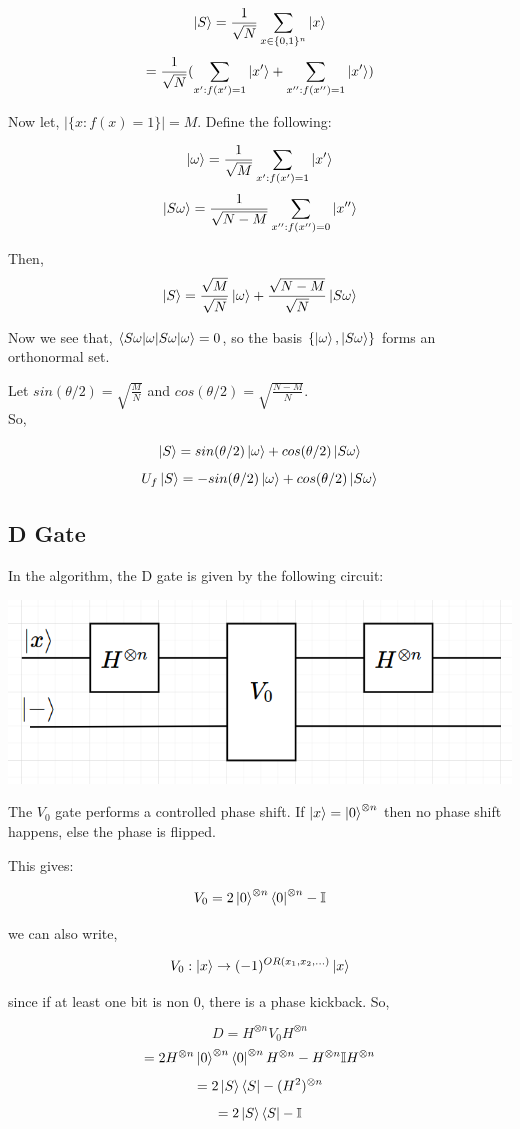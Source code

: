 \documentclass{article}
\begin{document}
$$\ket{S} = \frac{1}{\sqrt{N}}\sum_{x \in \{0,1\}^n}\ket{x}$$
$$=\frac{1}{\sqrt{N}}(\sum_{x': f(x')=1}\ket{x'} + \sum_{x'': f(x'')=1}\ket{x'})$$

Now let, $|\{x: f(x) = 1\}| = M$. Define the following:

$$\ket{\omega} = \frac{1}{\sqrt{M}}\sum_{x': f(x')=1}\ket{x'}$$
$$\ket{S\omega} = \frac{1}{\sqrt{N-M}}\sum_{x'': f(x'')=0}\ket{x''}$$

Then,
$$\ket{S} = \frac{\sqrt{M}}{\sqrt{N}}\ket{\omega} + \frac{\sqrt{N-M}}{\sqrt{N}}\ket{S\omega}$$

Now we see that, $\braket{S\omega|\omega} = 0$, so the basis $\{\ket{\omega}, \ket{S\omega}\}$
forms an orthonormal set.

Let $sin(\theta/2) = \sqrt{\frac{M}{N}}$ and $cos(\theta/2) = \sqrt{\frac{N-M}{N}}$.\\          So,

$$\ket{S} = sin(\theta/2)\ket{\omega} + cos(\theta/2)\ket{S\omega}$$
$$U_f\ket{S} = -sin(\theta/2)\ket{\omega} + cos(\theta/2)\ket{S\omega}$$

\subsection{D Gate}
In the algorithm, the D gate is given by the following circuit:

{
\centering
\includegraphics[width = 8 cm]{D.png}\par
}
The $V_0$ gate performs a controlled phase shift. If $\ket{x} = \ket{0}^{\otimes n}$ then
no phase shift happens, else the phase is flipped.

This gives:

$$V_0 = 2\ket{0}^{\otimes n}\bra{0}^{\otimes n} - \mathbb{I}$$

we can also write,

$$V_0 : \ket{x} \rightarrow (-1)^{OR(x_1, x_2, ...)}\ket{x}$$

since if at least one bit is non 0, there is a phase kickback.
So,

$$D = H^{\otimes n}V_0H^{\otimes n}$$
$$ = 2H^{\otimes n}\ket{0}^{\otimes n}\bra{0}^{\otimes n}H^{\otimes n} - H^{\otimes n}\mathbb{I}H^{\otimes n}$$
$$ = 2\ket{S}\bra{S} - (H^2)^{\otimes n}$$
$$ = 2\ket{S}\bra{S} - \mathbb{I}$$
\end{document}
